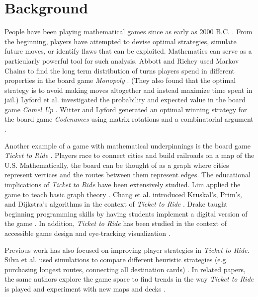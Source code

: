 \section{Background}
People have been playing mathematical games
since as early as 2000 B.C.
\cite{cornelius1986historical}.
From the beginning,
players have attempted to devise optimal
strategies, simulate future moves, or identify
flaws that can be exploited.
Mathematics can serve as a particularly powerful tool for
such analysis.
Abbott and Richey used Markov Chains
to find the long term 
distribution of turns players spend in different
properties in the board game
\textit{Monopoly} \cite{abbott1997take, magie1935}.
(They also found that the optimal strategy is to avoid making
moves altogether and instead maximize time spent in jail.)
Lyford et al. investigated the probability and expected value 
in the board game \textit{Camel Up}
\cite{bogen2014, lyford2019using}.
Witter and Lyford generated an optimal winning strategy for the 
board game \textit{Codenames} using matrix rotations
and a combinatorial argument \cite{chvatil2015}.

Another example of a game with mathematical underpinnings is
the board game \textit{Ticket to Ride} \cite{moon2004ticket}. 
Players race to connect 
cities and build railroads on a map of the U.S.
Mathematically, the board
can be thought of as a graph where
cities represent vertices and the
routes between them represent edges.
The educational implications of \textit{Ticket to Ride}
have been extensively studied.
Lim applied the game to teach basic graph theory
\cite{lim2007taking}.
Chang et al. introduced Kruskal's, Prim's, and Dijkstra's
algorithms in the context of \textit{Ticket to Ride}
\cite{chang2008learning}.
Drake taught beginning programming skills by having
students implement a digital version of the game \cite{drake2011teaching}.
In addition, \textit{Ticket to Ride} has been studied in the context of
accessible game design and eye-tracking visualization
\cite{eriksson2005enhancing, newn2017evaluating}.

Previous work has also focused on improving player 
strategies in \textit{Ticket to Ride}.
Silva et al. used simulations to compare different
heuristic strategies (e.g. purchasing longest routes,
connecting all destination cards) \cite{de2017playtesting}.
In related papers, the same authors explore the 
game space to find trends in the way \textit{Ticket to Ride}
is played and experiment with new maps and decks 
\cite{de2017evaluator, de2018evolving}.

